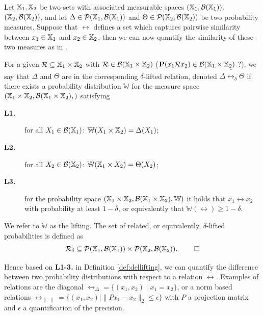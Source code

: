 \documentclass{ifacconf}
\renewcommand{\axx}[1]{{\color{orange} Ali: #1}}
\newcommand{\new}[1]{{\color{blue}#1}}
\newcommand{\cristi}[1]{{\color{orange}#1}}
\begin{document}
	Let ${\mathbb{X}}_1,{\mathbb{X}}_2$ be two sets with associated measurable spaces $({\mathbb{X}}_1,\mathcal B({\mathbb{X}}_1)),$ $({\mathbb{X}}_2,\mathcal B({\mathbb{X}}_2))$,
	and let   $\Delta\in \mathcal{P}({\mathbb{X}}_1,\mathcal B({\mathbb{X}}_1)) $ and  $\Theta\in \mathcal{P}({\mathbb{X}}_2,\mathcal B({\mathbb{X}}_2)) $ be two probability measures.  \new{Suppose that $\rel$ defines a set which \cristi{captures pairwise similarity between $x_1 \in {\mathbb{X}}_1$ and $x_2 \in {\mathbb{X}}_2$,}
	then we can now quantify the similarity of these two measures as in \cite{haesaert2017verification}.}
%	
\begin{definition}\label{def:dellifting}
For a given 
	$\mathcal{R}\subseteq {\mathbb{X}}_1\times {\mathbb{X}}_2$ with $\mathcal{R}\in \mathcal B({\mathbb{X}}_1\times {\mathbb{X}}_2)$ \cristi{($\mathbf{P}(x_1 \mathcal{R} x_2) \in \mathcal B({\mathbb{X}}_1 \times {\mathbb{X}}_2)$ ?)}, we say that  $\Delta$ and $ \Theta$ are in the corresponding $\delta$-lifted relation, denoted $\Delta \bar \rel_\delta \Theta$  if there exists a probability distribution $\mathbb W$ for the measure space $({\mathbb{X}}_1\times {\mathbb{X}}_2,\mathcal B({\mathbb{X}}_1\times {\mathbb{X}}_2),)$
	satisfying { \setlength{\parskip}{-1pt}\setlength{\parsep}{0pt}
		\begin{description}
			\item[\textbf{L1.}] for all $X_1\in \mathcal{B}({\mathbb{X}}_1)$: $\mathbb W(X_1\times {\mathbb{X}}_2)=\Delta(X_1)$;
			\item [\textbf{L2.}] for all $X_2\in \mathcal{B}({\mathbb{X}}_2)$:  $\mathbb W({\mathbb{X}}_1\times X_2)=\Theta(X_2)$;
			\item[\textbf{L3.}] for the probability space  $({\mathbb{X}}_1\times {\mathbb{X}}_2,\mathcal B({\mathbb{X}}_1\times {\mathbb{X}}_2), \mathbb W)$ it holds that
			$x_1\rel x_2$ with probability at least $1-\delta$, or equivalently that $\mathbb{W}\left(\rel\right)\geq1-\delta$.
	\end{description}}%
	
We refer to  $\mathbb W$ as the lifting. %
The set of related, or equivalently, $\delta$-lifted probabilities is defined as 
	\[\bar\rel_\delta\subseteq \mathcal{P}(\X_1,\mathcal B(\X_1))\times \mathcal{P}(\X_2,\mathcal B(\X_2)). \hfill \mbox{ }\qed\] 

\end{definition}

Hence based on \textbf{L1-3.} in Definition \ref{def:dellifting}, we can quantify the difference between two probability distributions with respect to a relation $\rel$.  \new{Examples of relations are the diagonal $\rel_{\Delta}=\{(x_1,x_2){\mid} x_1=x_2\}$, or a norm based relations $\rel_{\|\cdot\|}=\{(x_1,x_2){\mid} \|Px_1-x_2\|_2\leq \epsilon\}$ with  $P$  a projection matrix and $\epsilon$ a quantification of the precision. }
 
\end{document}
